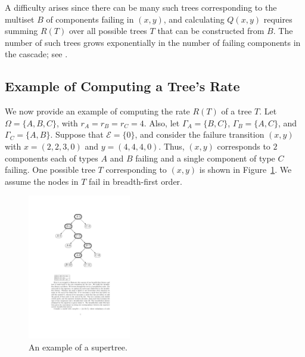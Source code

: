 \documentclass[12pt]{article}
\begin{document}
A difficulty arises since there can be many such trees corresponding to the
multiset $B$ of components failing in $(x, y)$, and calculating $Q(x, y)$
requires summing $R(T)$ over all possible trees $T$ that can be constructed from
$B$. The number of such trees grows exponentially in the number of failing
components in the cascade; see \cite{ING:2009}.

\subsection{Example of Computing a Tree's Rate}
\label{sec:exrate}

We now provide an example of computing the rate $R(T)$ of a tree $T$. Let
$\Omega = \{ A, B, C \}$, with $r_A = r_B = r_C = 4$. Also, let $\Gamma_A = \{
B, C \}$, $\Gamma_B = \{ A, C \}$, and $\Gamma_C = \{ A, B \}$. Suppose that
$\mathcal{E} = \{ 0 \}$, and consider the failure transition $(x, y)$ with $x =
(2, 2, 3, 0)$ and $y = (4, 4, 4, 0)$. Thus, $(x, y)$ corresponds to $2$
components each of types $A$ and $B$ failing and a single component of type $C$
failing. One possible tree $T$ corresponding to $(x, y)$ is shown in
Figure~\ref{fig:tree}. We assume the nodes in $T$ fail in breadth-first order.

\begin{figure}
\begin{center}
\includegraphics[width=0.4\textwidth]{fig_tree}
\end{center}
\caption{An example of a supertree.}
\label{fig:tree}
\end{figure}
\end{document}
